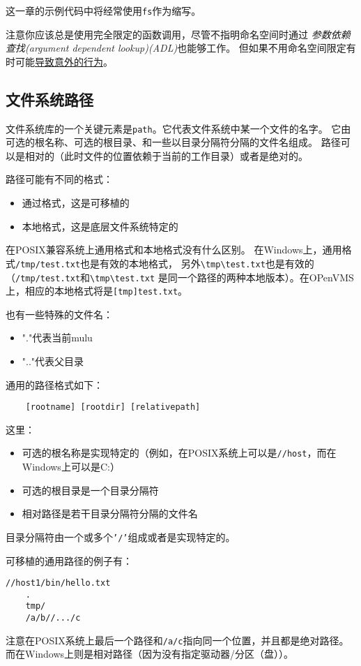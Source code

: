 这一章的示例代码中将经常使用\texttt{fs}作为缩写。

注意你应该总是使用完全限定的函数调用，尽管不指明命名空间时通过
\emph{参数依赖查找(argument dependent lookup)(ADL)}也能够工作。
但如果不用命名空间限定有时可能\hyperref[ADL导致意外行为]{导致意外的行为}。

\subsection{文件系统路径}\label{ch20.2.3}
文件系统库的一个关键元素是\texttt{path}。它代表文件系统中某一个文件的名字。
它由可选的根名称、可选的根目录、和一些以目录分隔符分隔的文件名组成。
路径可以是相对的（此时文件的位置依赖于当前的工作目录）或者是绝对的。

路径可能有不同的格式：
\begin{itemize}
    \item 通过格式，这是可移植的
    \item 本地格式，这是底层文件系统特定的
\end{itemize}
在POSIX兼容系统上通用格式和本地格式没有什么区别。
在Windows上，通用格式\texttt{/tmp/test.txt}也是有效的本地格式，
另外\texttt{\textbackslash tmp\textbackslash test.txt}也是有效的
（\texttt{/tmp/test.txt}和\texttt{\textbackslash tmp\textbackslash test.txt}
是同一个路径的两种本地版本）。在OPenVMS上，相应的本地格式将是\texttt{[tmp]test.txt}。

也有一些特殊的文件名：
\begin{itemize}
    \item "."代表当前mulu
    \item ".."代表父目录
\end{itemize}
通用的路径格式如下：
\begin{lstlisting}
    [rootname] [rootdir] [relativepath]
\end{lstlisting}
这里：
\begin{itemize}
    \item 可选的根名称是实现特定的（例如，在POSIX系统上可以是\texttt{//host}，而在Windows上可以是C:）
    \item 可选的根目录是一个目录分隔符
    \item 相对路径是若干目录分隔符分隔的文件名
\end{itemize}
目录分隔符由一个或多个\texttt{'/'}组成或者是实现特定的。

可移植的通用路径的例子有：
\begin{lstlisting}[commentstyle=\color{black}]
    //host1/bin/hello.txt
    .
    tmp/
    /a/b//.../c
\end{lstlisting}
注意在POSIX系统上最后一个路径和\texttt{/a/c}指向同一个位置，并且都是绝对路径。
而在Windows上则是相对路径（因为没有指定驱动器/分区（盘））。

